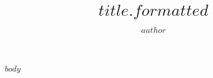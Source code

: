 \documentclass[journal=$journal$,manuscript=$type$]{achemso}
\author{$author$}
\affiliation{$aff$}
\title[$title.short$]{$title.formatted$}
\begin{document}
$body$
\end{document}
